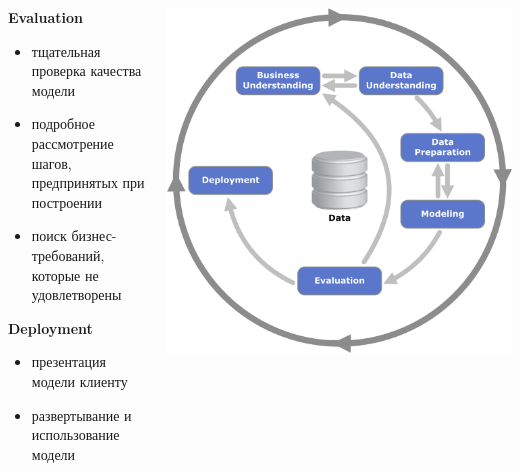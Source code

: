 \documentclass[aspectratio=169]{beamer}
\begin{document}
\begin{frame}{}

\begin{columns}
    \begin{column}{.7\textwidth}
		{\bf Evaluation}
		\begin{itemize}
		\item тщательная проверка качества модели
		\item подробное рассмотрение шагов, предпринятых при построении
		\item поиск бизнес-требований, которые не удовлетворены
		\end{itemize}

		\vspace{1em}

		{\bf Deployment}
		\begin{itemize}
		\item презентация модели клиенту
		\item развертывание и использование модели
		\end{itemize}
    \end{column}
    \begin{column}{.3\textwidth}
    \vspace{-0em}
		\begin{center}
   		\includegraphics[width=\textwidth]{images/crisp.png}
    \end{center}
    \end{column}
  \end{columns}

\end{frame}
\end{document}
